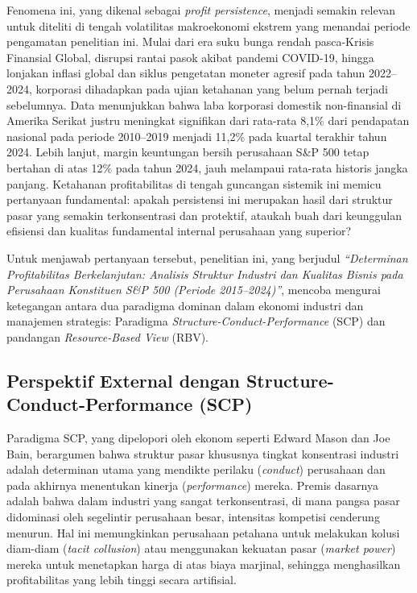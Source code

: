 \documentclass[12pt,a4paper]{report}
\begin{document}
Fenomena ini, yang dikenal sebagai \textit{profit persistence}, menjadi semakin relevan untuk diteliti di tengah volatilitas makroekonomi ekstrem yang menandai periode pengamatan penelitian ini. Mulai dari era suku bunga rendah pasca-Krisis Finansial Global, disrupsi rantai pasok akibat pandemi COVID-19, hingga lonjakan inflasi global dan siklus pengetatan moneter agresif pada tahun 2022--2024, korporasi dihadapkan pada ujian ketahanan yang belum pernah terjadi sebelumnya. Data menunjukkan bahwa laba korporasi domestik non-finansial di Amerika Serikat justru meningkat signifikan dari rata-rata 8,1\% dari pendapatan nasional pada periode 2010--2019 menjadi 11,2\% pada kuartal terakhir tahun 2024. Lebih lanjut, margin keuntungan bersih perusahaan S\&P 500 tetap bertahan di atas 12\% pada tahun 2024, jauh melampaui rata-rata historis jangka panjang. Ketahanan profitabilitas di tengah guncangan sistemik ini memicu pertanyaan fundamental: apakah persistensi ini merupakan hasil dari struktur pasar yang semakin terkonsentrasi dan protektif, ataukah buah dari keunggulan efisiensi dan kualitas fundamental internal perusahaan yang superior?

Untuk menjawab pertanyaan tersebut, penelitian ini, yang berjudul \textit{``Determinan Profitabilitas Berkelanjutan: Analisis Struktur Industri dan Kualitas Bisnis pada Perusahaan Konstituen S\&P 500 (Periode 2015--2024)''}, mencoba mengurai ketegangan antara dua paradigma dominan dalam ekonomi industri dan manajemen strategis: Paradigma \textit{Structure-Conduct-Performance} (SCP) dan pandangan \textit{Resource-Based View} (RBV).

\subsection{Perspektif External dengan Structure-Conduct-Performance (SCP)}

Paradigma SCP, yang dipelopori oleh ekonom seperti Edward Mason dan Joe Bain, berargumen bahwa struktur pasar khususnya tingkat konsentrasi industri adalah determinan utama yang mendikte perilaku (\textit{conduct}) perusahaan dan pada akhirnya menentukan kinerja (\textit{performance}) mereka. Premis dasarnya adalah bahwa dalam industri yang sangat terkonsentrasi, di mana pangsa pasar didominasi oleh segelintir perusahaan besar, intensitas kompetisi cenderung menurun. Hal ini memungkinkan perusahaan petahana untuk melakukan kolusi diam-diam (\textit{tacit collusion}) atau menggunakan kekuatan pasar (\textit{market power}) mereka untuk menetapkan harga di atas biaya marjinal, sehingga menghasilkan profitabilitas yang lebih tinggi secara artifisial.
\end{document}
